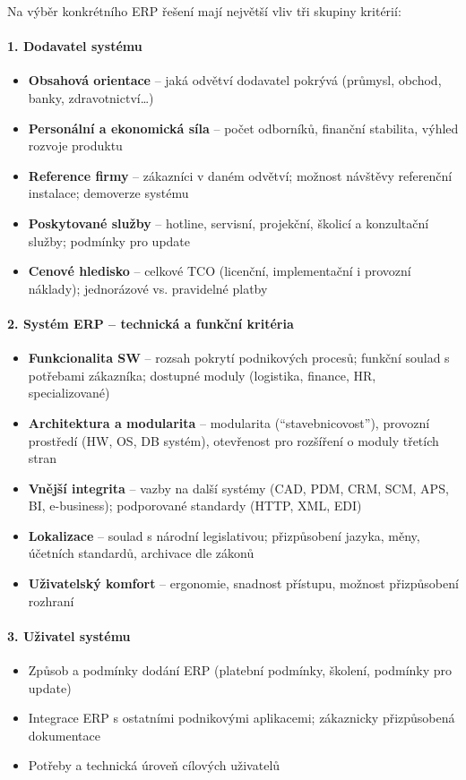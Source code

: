 Na výběr konkrétního ERP řešení mají největší vliv tři skupiny kritérií:

\paragraph{1. Dodavatel systému}
\begin{itemize}
  \item \textbf{Obsahová orientace} -- jaká odvětví dodavatel pokrývá (průmysl, obchod, banky,
    zdravotnictví\ldots)
  \item \textbf{Personální a ekonomická síla} -- počet odborníků, finanční stabilita, výhled rozvoje
    produktu
  \item \textbf{Reference firmy} -- zákazníci v daném odvětví; možnost návštěvy referenční instalace;
    demoverze systému
  \item \textbf{Poskytované služby} -- hotline, servisní, projekční, školicí a konzultační služby;
    podmínky pro update
  \item \textbf{Cenové hledisko} -- celkové TCO (licenční, implementační i provozní náklady);
    jednorázové vs. pravidelné platby
\end{itemize}

\paragraph{2. Systém ERP -- technická a funkční kritéria}
\begin{itemize}
  \item \textbf{Funkcionalita SW} -- rozsah pokrytí podnikových procesů; funkční soulad s potřebami
    zákazníka; dostupné moduly (logistika, finance, HR, specializované)
  \item \textbf{Architektura a modularita} -- modularita (``stavebnicovost''), provozní prostředí
    (HW, OS, DB systém), otevřenost pro rozšíření o moduly třetích stran
  \item \textbf{Vnější integrita} -- vazby na další systémy (CAD, PDM, CRM, SCM, APS, BI,
    e-business); podporované standardy (HTTP, XML, EDI)
  \item \textbf{Lokalizace} -- soulad s národní legislativou; přizpůsobení jazyka, měny, účetních
    standardů, archivace dle zákonů
  \item \textbf{Uživatelský komfort} -- ergonomie, snadnost přístupu, možnost přizpůsobení rozhraní
\end{itemize}

\paragraph{3. Uživatel systému}
\begin{itemize}
  \item Způsob a podmínky dodání ERP (platební podmínky, školení, podmínky pro update)
  \item Integrace ERP s ostatními podnikovými aplikacemi; zákaznicky přizpůsobená dokumentace
  \item Potřeby a technická úroveň cílových uživatelů
\end{itemize}

